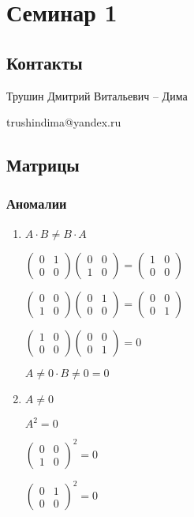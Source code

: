 \section{Семинар 1}

\subsection{Контакты}
Трушин Дмитрий Витальевич -- Дима

trushindima@yandex.ru

\subsection{Матрицы}
\subsubsection{Аномалии}

\begin{enumerate}
\item 
    $A \cdot B \neq B \cdot A$

    $\begin{pmatrix} 0 & 1 \\ 0 & 0 \end{pmatrix} 
    \begin{pmatrix} 0 & 0 \\ 1 & 0 \end{pmatrix}
    =
    \begin{pmatrix} 1 & 0 \\ 0 & 0 \end{pmatrix}$

    $\begin{pmatrix} 0 & 0 \\ 1 & 0 \end{pmatrix}
    \begin{pmatrix} 0 & 1 \\ 0 & 0 \end{pmatrix} 
    =
    \begin{pmatrix} 0 & 0 \\ 0 & 1 \end{pmatrix}$

    $\begin{pmatrix} 1 & 0 \\ 0 & 0 \end{pmatrix} 
    \begin{pmatrix} 0 & 0 \\ 0 & 1 \end{pmatrix} = 0$

    $A \neq 0 \cdot B \neq 0 = 0$

\item 
    $A \neq 0$
    
    $A^2 = 0$

    $\begin{pmatrix} 0 & 0 \\ 1 & 0 \end{pmatrix}^2 = 0$
    
    $\begin{pmatrix} 0 & 1 \\ 0 & 0 \end{pmatrix}^2 = 0$
\end{enumerate}

